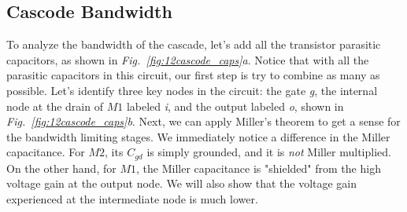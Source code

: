 \subsection{Cascode Bandwidth}
To analyze the bandwidth of the cascade, let's add all the transistor parasitic capacitors, as shown in \emph{Fig.~\ref{fig:12cascode_caps}a}.  Notice that with all the parasitic capacitors in this circuit, our first step is try to combine as many as possible.   Let's identify three key nodes in the circuit: the gate \emph{g}, the internal node at the drain of $M1$ labeled \emph{i}, and the output labeled \emph{o}, shown in \emph{Fig.~\ref{fig:12cascode_caps}b}.  Next, we can apply Miller's theorem to get a sense for the bandwidth limiting stages.  We immediately notice a difference in the Miller capacitance.  For $M2$, its $C_{gd}$ is simply grounded, and it is \textit{not} Miller multiplied.  On the other hand, for $M1$, the Miller capacitance is "shielded" from the high voltage gain at the output node.  We will also show that the voltage gain experienced at the intermediate node is much lower.  

